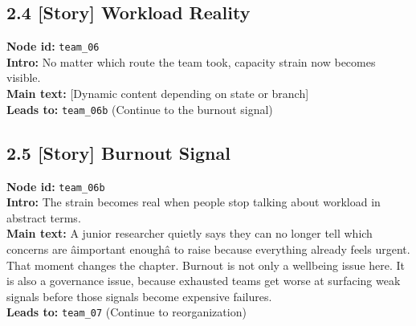\documentclass[11pt]{article}
\begin{document}
\subsection*{2.4 [Story] Workload Reality}
\textbf{Node id:} \texttt{team\_06}\\
\textbf{Intro:} No matter which route the team took, capacity strain now becomes visible.\\
\textbf{Main text:} [Dynamic content depending on state or branch]\\
\textbf{Leads to:} \texttt{team\_06b} (Continue to the burnout signal)\\
\subsection*{2.5 [Story] Burnout Signal}
\textbf{Node id:} \texttt{team\_06b}\\
\textbf{Intro:} The strain becomes real when people stop talking about workload in abstract terms.\\
\textbf{Main text:} A junior researcher quietly says they can no longer tell which concerns are âimportant enoughâ to raise because everything already feels urgent. That moment changes the chapter. Burnout is not only a wellbeing issue here. It is also a governance issue, because exhausted teams get worse at surfacing weak signals before those signals become expensive failures.\\
\textbf{Leads to:} \texttt{team\_07} (Continue to reorganization)\\
\end{document}
